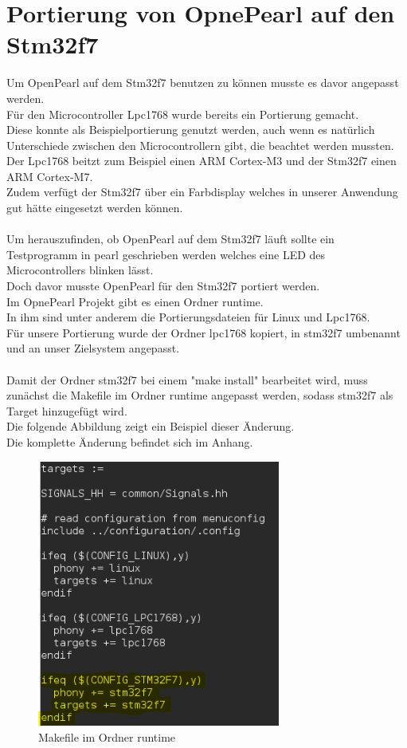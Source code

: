 
\section{Portierung von OpnePearl auf den Stm32f7}
Um OpenPearl auf dem Stm32f7 benutzen zu können musste es davor angepasst werden.\\
Für den Microcontroller Lpc1768 wurde bereits ein Portierung gemacht.\\
Diese konnte als Beispielportierung genutzt werden, auch wenn es natürlich Unterschiede zwischen den Microcontrollern gibt, die beachtet werden mussten.\\
Der Lpc1768 beitzt zum Beispiel einen ARM Cortex-M3 und der Stm32f7 einen ARM Cortex-M7.\\
Zudem verfügt der Stm32f7 über ein Farbdisplay welches in unserer Anwendung gut hätte eingesetzt werden können.\\
\\
Um herauszufinden, ob OpenPearl auf dem Stm32f7 läuft sollte ein Testprogramm in pearl geschrieben werden welches eine LED des Microcontrollers blinken lässt.\\
Doch davor musste OpenPearl für den Stm32f7 portiert werden.\\
Im OpnePearl Projekt gibt es einen Ordner runtime.\\
In ihm sind unter anderem die Portierungsdateien für Linux und Lpc1768.\\
Für unsere Portierung wurde der Ordner lpc1768 kopiert, in stm32f7 umbenannt und an unser Zielsystem angepasst.\\
\\
Damit der Ordner stm32f7 bei einem "make install" bearbeitet wird, muss zunächst die Makefile im Ordner runtime angepasst werden, sodass stm32f7 als Target hinzugefügt wird.\\
Die folgende Abbildung zeigt ein Beispiel dieser Änderung.\\
Die komplette Änderung befindet sich im Anhang.\\
\begin{figure}[h]
\begin{center}
\includegraphics[width=8cm]{grafiken/Makefile_runtime1.png}
\caption{Makefile im Ordner runtime}
\label{Makefile_runtime}
\end{center}
\end{figure}
